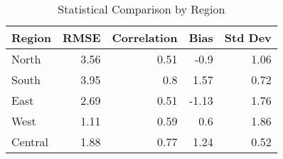\begin{table}[htbp]
\centering
\caption{Statistical Comparison by Region}
\label{tab:statistics}
\begin{tabular}{lrrrr}
\toprule
Region & RMSE & Correlation & Bias & Std Dev \\
\midrule
North & 3.56 & 0.51 & -0.9 & 1.06 \\
South & 3.95 & 0.8 & 1.57 & 0.72 \\
East & 2.69 & 0.51 & -1.13 & 1.76 \\
West & 1.11 & 0.59 & 0.6 & 1.86 \\
Central & 1.88 & 0.77 & 1.24 & 0.52 \\
\bottomrule
\end{tabular}
\end{table}
